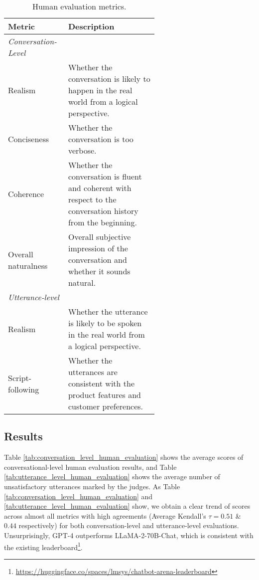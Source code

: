 \begin{table}[t]
\small
\begin{center}
\setlength{\tabcolsep}{3pt} %
    \begin{tabular}{lp{0.6\linewidth} }
    \hline
\textbf{Metric} & \textbf{Description}\\ \hline
\textit{Conversation-Level} &  \\ \hline
Realism & Whether the conversation is likely to happen in the real world from a logical perspective. \\ \hline
Conciseness & Whether the conversation is too verbose. \\ \hline
Coherence & Whether the conversation is fluent and coherent with respect to the conversation history from the beginning. \\ \hline
Overall naturalness & Overall subjective impression of the conversation and whether it sounds natural. \\ \hline \hline
\textit{Utterance-level} &  \\ \hline
Realism & Whether the utterance is likely to be spoken in the real world from a logical perspective. \\ \hline
Script-following & Whether the utterances are consistent with the product features and customer preferences. \\ \hline
\end{tabular}
\vspace{-1em}
\caption{Human evaluation metrics.}
\label{tab:human_evaluation_metrics}
\end{center}
\vspace{-3em}
\end{table}


\subsection{Results} \label{sec:human_evaluation_results}
Table \ref{tab:conversation_level_human_evaluation} shows the average scores of conversational-level human evaluation results, and Table \ref{tab:utterance_level_human_evaluation} shows the average number of unsatisfactory utterances marked by the judges. %
As Table \ref{tab:conversation_level_human_evaluation} and \ref{tab:utterance_level_human_evaluation} show, we obtain a clear trend of scores across almost all metrics with high agreements (Average Kendall's $\tau=0.51$ \& $0.44$ respectively) %
for both conversation-level and utterance-level evaluations. Unsurprisingly, GPT-4 outperforms LLaMA-2-70B-Chat, which is consistent with the existing leaderboard\footnote{\url{https://huggingface.co/spaces/lmsys/chatbot-arena-leaderboard}}.
 
